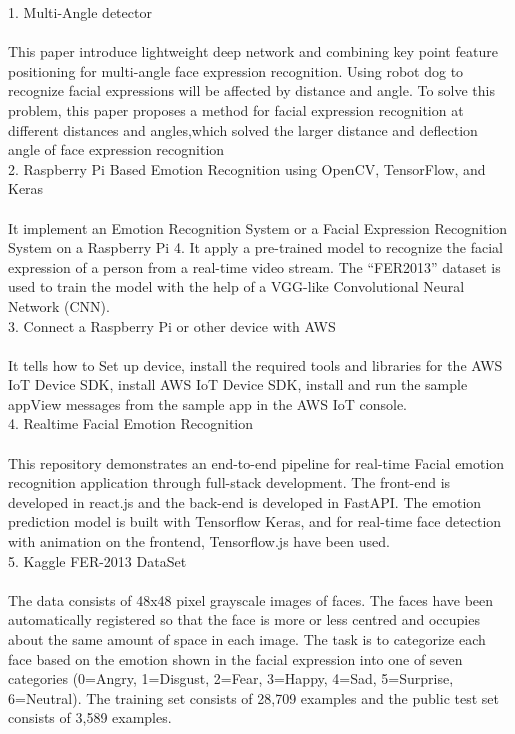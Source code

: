 \begin{itemize}
    1. Multi-Angle detector\cite{r15}
    \\
    \\This paper introduce lightweight deep network and combining key point feature positioning for multi-angle face expression recognition. Using robot dog to recognize facial expressions will be affected by distance and angle. To solve this problem, this paper proposes a method for facial expression recognition at different distances and angles,which solved the larger distance and deflection angle of face expression recognition \\

    2. Raspberry Pi Based Emotion Recognition using OpenCV, TensorFlow, and Keras \cite{r16}
    \\
    \\It implement an Emotion Recognition System or a Facial Expression Recognition System on a Raspberry Pi 4. It apply a pre-trained model to recognize the facial expression of a person from a real-time video stream. The “FER2013” dataset is used to train the model with the help of a VGG-like Convolutional Neural Network (CNN).\\

    3. Connect a Raspberry Pi or other device with AWS\cite{r17} \\
    \\It tells how to Set up device, install the required tools and libraries for the AWS IoT Device SDK, install AWS IoT Device SDK, install and run the sample appView messages from the sample app in the AWS IoT console.\\

    4. Realtime Facial Emotion Recognition\cite{r18} \\
    \\This repository demonstrates an end-to-end pipeline for real-time Facial emotion recognition application through full-stack development. The front-end is developed in react.js and the back-end is developed in FastAPI. The emotion prediction model is built with Tensorflow Keras, and for real-time face detection with animation on the frontend, Tensorflow.js have been used.\\

    5. Kaggle FER-2013 DataSet\cite{r19} \\
    \\The data consists of 48x48 pixel grayscale images of faces. The faces have been automatically registered so that the face is more or less centred and occupies about the same amount of space in each image.
The task is to categorize each face based on the emotion shown in the facial expression into one of seven categories (0=Angry, 1=Disgust, 2=Fear, 3=Happy, 4=Sad, 5=Surprise, 6=Neutral). The training set consists of 28,709 examples and the public test set consists of 3,589 examples.\\


\end{itemize}
